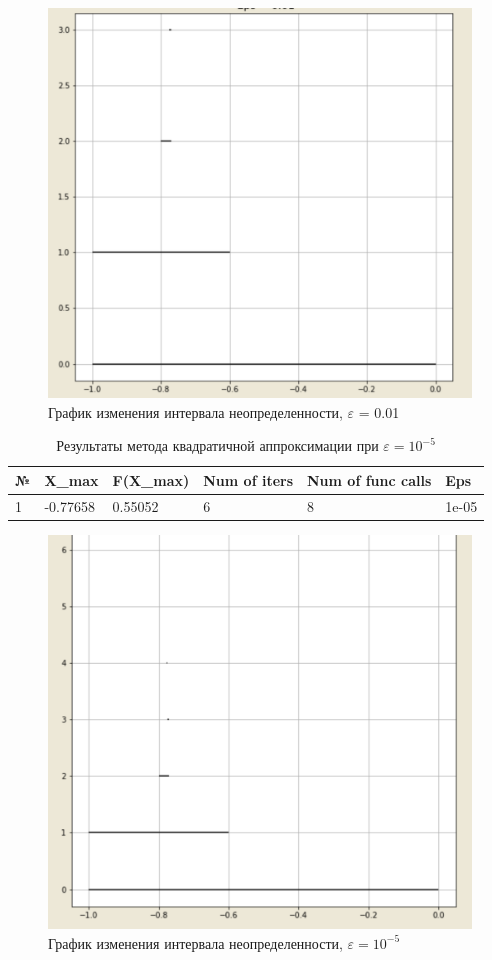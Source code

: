 \documentclass[10pt]{article}
\begin{document}
\begin{enumerate}
\begin{figure}[H]
\centering
\includegraphics[width=0.8\linewidth]{7.png}
\caption{График изменения интервала неопределенности, $\varepsilon$ = 0.01}
\label{fig:image1}
\end{figure}
\newpage


\begin{table}[H]
\caption{Результаты метода квадратичной аппроксимации при $\varepsilon = 10^{-5}$}
\begin{center}
\begin{tabular}{|l|l|l|l|l|l|}
\hline
№ & X\_max    & F(X\_max) & Num of iters & Num of func calls & Eps  \\
\hline
     1 & -0.77658 &  0.55052 &              6 &                   8 &
1e-05 \\
\hline
\end{tabular}
\end{center}
\end{table}

\begin{figure}[H]
\centering
\includegraphics[width=0.8\linewidth]{8.png}
\caption{График изменения интервала неопределенности, $\varepsilon = 10^{-5}$}
\label{fig:image1}
\end{figure}
\newpage



\end{enumerate}
\end{document}
